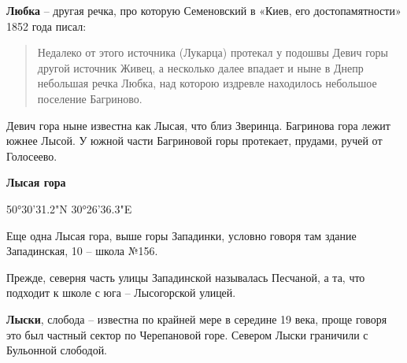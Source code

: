 \medskip

\textbf{Любка} – другая речка, про которую Семеновский в «Киев, его достопамятности» 1852 года писал:

\begin{quotation}
Недалеко от этого источника (Лукарца) протекал у подошвы Девич горы другой источник Живец, а несколько далее впадает и ныне в Днепр не\-большая речка Любка, над которою издревле находилось небольшое поселение Багриново.
\end{quotation}

Девич гора ныне известна как Лысая, что близ Зверинца. Багринова гора лежит южнее Лысой. У южной части Багриновой горы протекает, прудами, ручей от Голосеево.\\

\medskip

\textbf{Лысая гора}

50°30'31.2"N 30°26'36.3"E

Еще одна Лысая гора, выше горы Западинки, условно говоря там здание Западинская, 10 – школа  №156.

Прежде, северня часть улицы Западинской называлась Песчаной, а та, что подходит к школе с юга – Лысогорской улицей.\\

\medskip


\textbf{Лыски}, слобода – известна по крайней мере в середине 19 века, проще говоря это был частный сектор по Черепановой горе. Севером Лыски граничили с Бульонной слободой.\\


